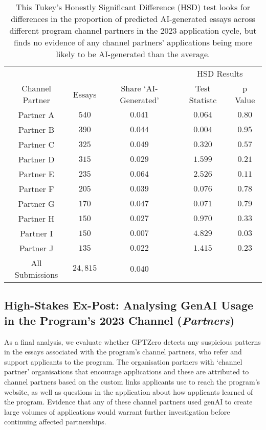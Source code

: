 \begin{table}[htb]
    \centering
    \caption{This Tukey's Honestly Significant Difference (HSD) test looks for differences in the proportion of predicted AI-generated essays across different program channel partners in the 2023 application cycle, but finds no evidence of any channel partners' applications being more likely to be AI-generated than the average.}
    \label{tab:c3_partner_anova}
    \begin{tabular}{ c c c c c }
        \toprule
        \multicolumn{3}{c}{} & \multicolumn{2}{c}{HSD Results} \\
        \cmidrule(lr){4-5}
        Channel Partner & Essays & Share `AI-Generated' & Test Statistc & p Value \\
        \midrule
        Partner A & $540$ & $0.041$ & $0.064$ & $0.80$ \\
        Partner B & $390$ & $0.044$ & $0.004$ & $0.95$ \\
        Partner C & $325$ & $0.049$ & $0.320$ & $0.57$ \\
        Partner D & $315$ & $0.029$ & $1.599$ & $0.21$ \\
        Partner E & $235$ & $0.064$ & $2.526$ & $0.11$ \\
        Partner F & $205$ & $0.039$ & $0.076$ & $0.78$ \\
        Partner G & $170$ & $0.047$ & $0.071$ & $0.79$ \\
        Partner H & $150$ & $0.027$ & $0.970$ & $0.33$ \\
        Partner I & $150$ & $0.007$ & $\mathbf{4.829}$ & $\mathbf{0.03}$ \\
        Partner J & $135$ & $0.022$ & $1.415$ & $0.23$ \\%
        \midrule
        All Submissions & $24,815$ & $0.040$ & \\
        \bottomrule
    \end{tabular}
\end{table}

\subsection{High-Stakes Ex-Post: Analysing GenAI Usage in the Program's 2023 Channel (\emph{Partners})}
As a final analysis, we evaluate whether GPTZero detects any suspicious patterns in the essays associated with the program's channel partners, who refer and support applicants to the program. The organisation partners with `channel partner' organisations that encourage applications and these are attributed to channel partners based on the custom links applicants use to reach the program's website, as well as questions in the application about how applicants learned of the program. Evidence that any of these channel partners used genAI to create large volumes of applications would warrant further investigation before continuing affected partnerships. 

